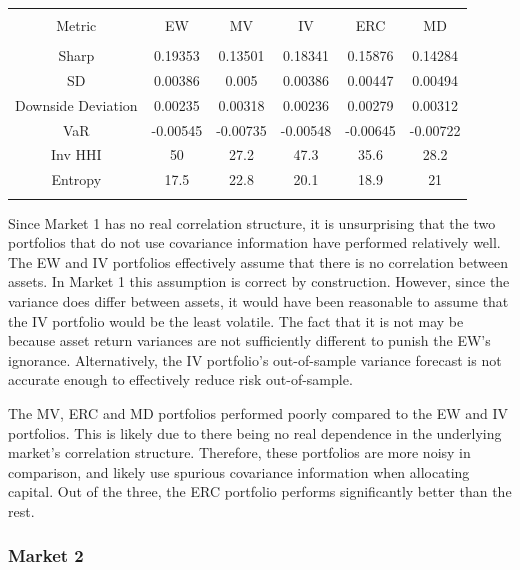 \documentclass[11pt,preprint, authoryear]{elsarticle}
\let\origtable\table
\let\endorigtable\endtable
\renewenvironment{table}[1][2] {
    \expandafter\origtable\expandafter[H]
} {
    \endorigtable
}
\numberwithin{equation}{section}
\numberwithin{figure}{section}
\numberwithin{table}{section}
\begin{document}
\begin{table}[!htbp] \centering 
  \caption{Market 1 - Portfolio Risk Metrics} 
  \label{rm1} 
\begin{tabular}{@{\extracolsep{5pt}} cccccc} 
\\[-1.8ex]\hline 
\hline \\[-1.8ex] 
Metric & EW & MV & IV & ERC & MD \\ 
\hline \\[-1.8ex] 
Sharp & 0.19353 & 0.13501 & 0.18341 & 0.15876 & 0.14284 \\ 
SD & 0.00386 & 0.005 & 0.00386 & 0.00447 & 0.00494 \\ 
Downside Deviation & 0.00235 & 0.00318 & 0.00236 & 0.00279 & 0.00312 \\ 
VaR & -0.00545 & -0.00735 & -0.00548 & -0.00645 & -0.00722 \\ 
Inv HHI & 50 & 27.2 & 47.3 & 35.6 & 28.2 \\ 
Entropy & 17.5 & 22.8 & 20.1 & 18.9 & 21 \\ 
\hline \\[-1.8ex] 
\end{tabular} 
\end{table}

Since Market 1 has no real correlation structure, it is unsurprising
that the two portfolios that do not use covariance information have
performed relatively well. The EW and IV portfolios effectively assume
that there is no correlation between assets. In Market 1 this assumption
is correct by construction. However, since the variance does differ
between assets, it would have been reasonable to assume that the IV
portfolio would be the least volatile. The fact that it is not may be
because asset return variances are not sufficiently different to punish
the EW's ignorance. Alternatively, the IV portfolio's out-of-sample
variance forecast is not accurate enough to effectively reduce risk
out-of-sample.

The MV, ERC and MD portfolios performed poorly compared to the EW and IV
portfolios. This is likely due to there being no real dependence in the
underlying market's correlation structure. Therefore, these portfolios
are more noisy in comparison, and likely use spurious covariance
information when allocating capital. Out of the three, the ERC portfolio
performs significantly better than the rest.

\hypertarget{market-2}{%
\subsubsection{Market 2}\label{market-2}}
\end{document}
